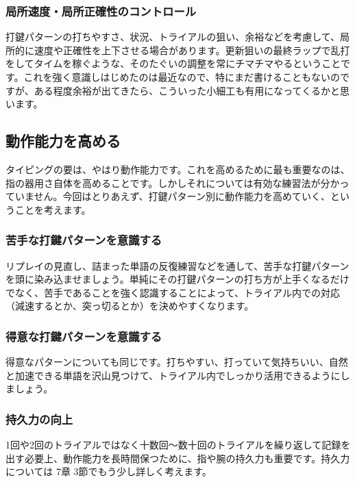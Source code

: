 \subsubsection*{局所速度・局所正確性のコントロール}

打鍵パターンの打ちやすさ、状況、トライアルの狙い、余裕などを考慮して、局所的に速度や正確性を上下させる場合があります。更新狙いの最終ラップで乱打をしてタイムを稼ぐような、そのたぐいの調整を常にチマチマやるということです。これを強く意識しはじめたのは最近なので、特にまだ書けることもないのですが、ある程度余裕が出てきたら、こういった小細工も有用になってくるかと思います。

\subsection{動作能力を高める}

タイピングの要は、やはり動作能力です。これを高めるために最も重要なのは、指の器用さ自体を高めることです。しかしそれについては有効な練習法が分かっていません。今回はとりあえず、打鍵パターン別に動作能力を高めていく、ということを考えます。

\subsubsection*{苦手な打鍵パターンを意識する}

リプレイの見直し、詰まった単語の反復練習などを通して、苦手な打鍵パターンを頭に染み込ませましょう。単純にその打鍵パターンの打ち方が上手くなるだけでなく、苦手であることを強く認識することによって、トライアル内での対応（減速するとか、突っ切るとか）を決めやすくなります。

\subsubsection*{得意な打鍵パターンを意識する}

得意なパターンについても同じです。打ちやすい、打っていて気持ちいい、自然と加速できる単語を沢山見つけて、トライアル内でしっかり活用できるようにしましょう。

\subsubsection*{持久力の向上}

1回や2回のトライアルではなく十数回～数十回のトライアルを繰り返して記録を出す必要上、動作能力を長時間保つために、指や腕の持久力も重要です。持久力については 7章 3節でもう少し詳しく考えます。

